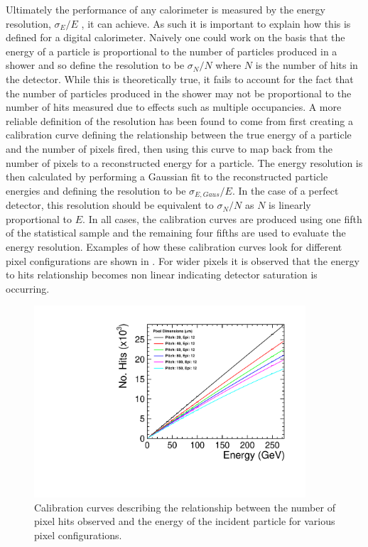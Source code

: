 Ultimately the performance of any calorimeter is measured by the energy resolution, $\sigma_E/E$ , it can achieve. As such it is important to explain how this is defined for a digital calorimeter. Naively one could work on the basis that the energy of a particle is proportional to the number of particles produced in a shower and so define the resolution to be $\sigma_N/N$ where $N$ is the number of hits in the detector. While this is theoretically true, it fails to account for the fact that the number of particles produced in the shower may not be proportional to the number of hits measured due to effects such as multiple occupancies. A more reliable definition of the resolution has been found to come from first creating a calibration curve defining the relationship between the true energy of a particle and the number of pixels fired, then using this curve to map back from the number of pixels to a reconstructed energy for a particle. The energy resolution is then calculated by performing a Gaussian fit to the reconstructed particle energies and defining the resolution to be $\sigma_{E,Gaus}/E$. In the case of a perfect detector, this resolution should be equivalent to $\sigma_N/N$ as $N$ is linearly proportional to $E$. In all cases, the calibration curves are produced using one fifth of the statistical sample and the remaining four fifths are used to evaluate the energy resolution. Examples of how these calibration curves look for different pixel configurations are shown in . For wider pixels it is observed that the energy to hits relationship becomes non linear indicating detector saturation is occurring. 

\begin{figure}
  \centering
  \includegraphics[width=0.9\textwidth,keepaspectratio]{DECALStudies/fig/CalibrationCurves.pdf}
  \caption{Calibration curves describing the relationship between the number of pixel hits observed and the energy of the incident particle for various pixel configurations.}
  \label{fig:calibrationcurves}
\end{figure}

